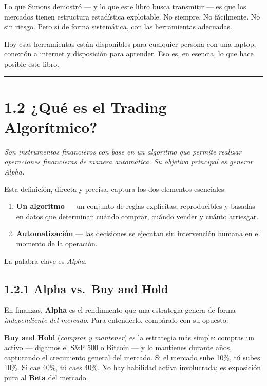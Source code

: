 \documentclass[12pt, a4paper, twoside, openright]{book}
\providecommand{\tightlist}{%
  \setlength{\itemsep}{2pt}\setlength{\parskip}{0pt}}
\renewenvironment{quote}{%
  \begin{mdframed}[style=quotestyle]%
  \itshape\color{bkblue}%
}{%
  \end{mdframed}%
}
\numberwithin{figure}{chapter}
\numberwithin{table}{chapter}
\begin{document}
Lo que Simons demostró --- y lo que este libro busca transmitir --- es
que los mercados tienen estructura estadística explotable. No siempre.
No fácilmente. No sin riesgo. Pero sí de forma sistemática, con las
herramientas adecuadas.

Hoy esas herramientas están disponibles para cualquier persona con una
laptop, conexión a internet y disposición para aprender. Eso es, en
esencia, lo que hace posible este libro.

\begin{center}\rule{0.5\linewidth}{0.5pt}\end{center}

\section{1.2 ¿Qué es el Trading
Algorítmico?}\label{quuxe9-es-el-trading-algoruxedtmico}

\begin{quote}
\emph{Son instrumentos financieros con base en un algoritmo que permite
realizar operaciones financieras de manera automática. Su objetivo
principal es generar Alpha.}
\end{quote}

Esta definición, directa y precisa, captura los dos elementos
esenciales:

\begin{enumerate}
\def\labelenumi{\arabic{enumi}.}
\tightlist
\item
  \textbf{Un algoritmo} --- un conjunto de reglas explícitas,
  reproducibles y basadas en datos que determinan cuándo comprar, cuándo
  vender y cuánto arriesgar.
\item
  \textbf{Automatización} --- las decisiones se ejecutan sin
  intervención humana en el momento de la operación.
\end{enumerate}

La palabra clave es \emph{Alpha}.

\subsection{1.2.1 Alpha vs.~Buy and Hold}\label{alpha-vs.-buy-and-hold}

En finanzas, \textbf{Alpha} es el rendimiento que una estrategia genera
de forma \emph{independiente del mercado}. Para entenderlo, compáralo
con su opuesto:

\textbf{Buy and Hold} (\emph{comprar y mantener}) es la estrategia más
simple: compras un activo --- digamos el S\&P 500 o Bitcoin --- y lo
mantienes durante años, capturando el crecimiento general del mercado.
Si el mercado sube 10\%, tú subes 10\%. Si cae 40\%, tú caes 40\%. No
hay habilidad activa involucrada; es exposición pura al \textbf{Beta}
del mercado.
\end{document}
